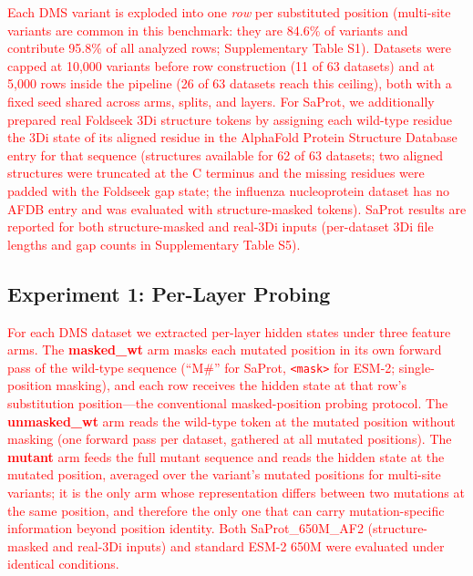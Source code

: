 \documentclass[numbered,webpdf,modern,large]{oup-authoring-template}
\newcommand{\rev}[1]{\textcolor{red}{#1}}
\begin{document}
\rev{Each DMS variant is exploded into one \emph{row} per substituted position
(multi-site variants are common in this benchmark: they are
84.6\% of variants and contribute 95.8\% of all analyzed rows;
Supplementary Table S1). Datasets were capped at 10,000 variants before row construction
(11 of 63 datasets) and at 5,000 rows inside the pipeline (26 of 63 datasets
reach this ceiling), both with a fixed seed shared across arms, splits, and
layers. For SaProt, we additionally prepared real Foldseek 3Di structure tokens by
assigning each wild-type residue the 3Di state of its aligned residue in the
AlphaFold Protein Structure Database entry for that sequence (structures available for
62 of 63 datasets; two aligned structures were truncated at the C terminus and the
missing residues were padded with the Foldseek gap state; the influenza nucleoprotein
dataset has no AFDB entry and was evaluated with structure-masked tokens). SaProt
results are reported for both structure-masked and real-3Di inputs
(per-dataset 3Di file lengths and gap counts in Supplementary Table
S5).}

\subsection{Experiment 1: Per-Layer Probing}

\rev{For each DMS dataset we extracted per-layer hidden states under three feature
arms. The \textbf{masked\_wt} arm masks each mutated position in its own forward
pass of the wild-type sequence (``M\#'' for SaProt, \texttt{<mask>} for ESM-2;
single-position masking), and each row receives the hidden state at that row's
substitution position---the conventional masked-position probing protocol.
The \textbf{unmasked\_wt} arm reads the wild-type token at the mutated position
without masking (one forward pass per dataset, gathered at all mutated
positions). The \textbf{mutant} arm feeds the full mutant sequence and reads the
hidden state at the mutated position, averaged over the variant's mutated
positions for multi-site variants; it is the only arm whose representation
differs between two mutations at the same position, and therefore the only one
that can carry mutation-specific information beyond position identity. Both
SaProt\_650M\_AF2 (structure-masked and real-3Di inputs) and standard ESM-2 650M
were evaluated under identical conditions.}
\end{document}
